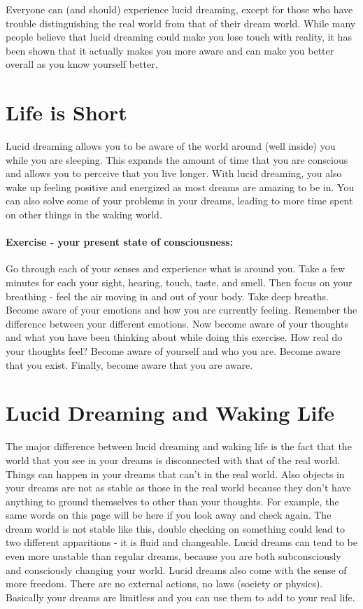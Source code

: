 \documentclass{book}
\begin{document}
Everyone can (and should) experience lucid dreaming, except for those who have trouble distinguishing the real world from that of their dream world. While many people believe that lucid dreaming could make you lose touch with reality, it has been shown that it actually makes you more aware and can make you better overall as you know yourself better.

\section{Life is Short}
Lucid dreaming allows you to be aware of the world around (well inside) you while you are sleeping. This expands the amount of time that you are conscious and allows you to perceive that you live longer. With lucid dreaming, you also wake up feeling positive and energized as most dreams are amazing to be in. You can also solve some of your problems in your dreams, leading to more time spent on other things in the waking world.

\paragraph{Exercise - your present state of consciousness:} Go through each of your senses and experience what is around you. Take a few minutes for each your sight, hearing, touch, taste, and smell. Then focus on your breathing - feel the air moving in and out of your body. Take deep breaths. Become aware of your emotions and how you are currently feeling. Remember the difference between your different emotions. Now become aware of your thoughts and what you have been thinking about while doing this exercise. How real do your thoughts feel? Become aware of yourself and who you are. Become aware that you exist. Finally, become aware that you are aware.

\section{Lucid Dreaming and Waking Life}
The major difference between lucid dreaming and waking life is the fact that the world that you see in your dreams is disconnected with that of the real world. Things can happen in your dreams that can't in the real world. Also objects in your dreams are not as stable as those in the real world because they don't have anything to ground themselves to other than your thoughts. For example, the same words on this page will be here if you look away and check again. The dream world is not stable like this, double checking on something could lead to two different apparitions - it is fluid and changeable. Lucid dreams can tend to be even more unstable than regular dreams, because you are both subconsciously and consciously changing your world. Lucid dreams also come with the sense of more freedom. There are no external actions, no laws (society or physics). Basically your dreams are limitless and you can use them to add to your real life.
\end{document}
